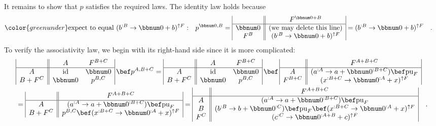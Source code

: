 It remains to show that $p$ satisfies the required laws. The identity
law holds because
\begin{align*}
{\color{greenunder}\text{expect to equal }(b^{:B}\rightarrow\bbnum 0+b)^{\uparrow F}:}\quad & p^{\bbnum 0,B}=\begin{array}{|c||c|}
 & F^{\bbnum 0+B}\\
\hline \bbnum 0 & \text{(we may delete this line)}\\
F^{B} & (b^{:B}\rightarrow\bbnum 0+b)^{\uparrow F}
\end{array}=(b^{:B}\rightarrow\bbnum 0+b)^{\uparrow F}\quad.
\end{align*}
To verify the associativity law, we begin with its right-hand side
since it is more complicated:
\begin{align*}
 & \begin{array}{|c||cc|}
 & A & F^{B+C}\\
\hline A & \text{id} & \bbnum 0\\
B+F^{C} & \bbnum 0 & p^{B,C}
\end{array}\,\bef p^{A,B+C}=\begin{array}{|c||cc|}
 & A & F^{B+C}\\
\hline A & \text{id} & \bbnum 0\\
B+F^{C} & \bbnum 0 & p^{B,C}
\end{array}\,\bef\,\begin{array}{|c||c|}
 & F^{A+B+C}\\
\hline A & (a^{:A}\rightarrow a+\bbnum 0^{:B+C})\bef\text{pu}_{F}\\
F^{B+C} & (x^{:B+C}\rightarrow\bbnum 0^{:A}+x)^{\uparrow F}
\end{array}\\
 & =\begin{array}{|c||c|}
 & F^{A+B+C}\\
\hline A & (a^{:A}\rightarrow a+\bbnum 0^{:B+C})\bef\text{pu}_{F}\\
B+F^{C} & p^{B,C}\bef(x^{:B+C}\rightarrow\bbnum 0^{:A}+x)^{\uparrow F}
\end{array}=\begin{array}{|c||c|}
 & F^{A+B+C}\\
\hline A & (a^{:A}\rightarrow a+\bbnum 0^{:B+C})\bef\text{pu}_{F}\\
B & (b^{:B}\rightarrow b+\bbnum 0^{:C})\bef\text{pu}_{F}\bef(x^{:B+C}\rightarrow\bbnum 0^{:A}+x)^{\uparrow F}\\
F^{C} & (c^{:C}\rightarrow\bbnum 0^{:A+B}+c)^{\uparrow F}
\end{array}\quad.
\end{align*}
